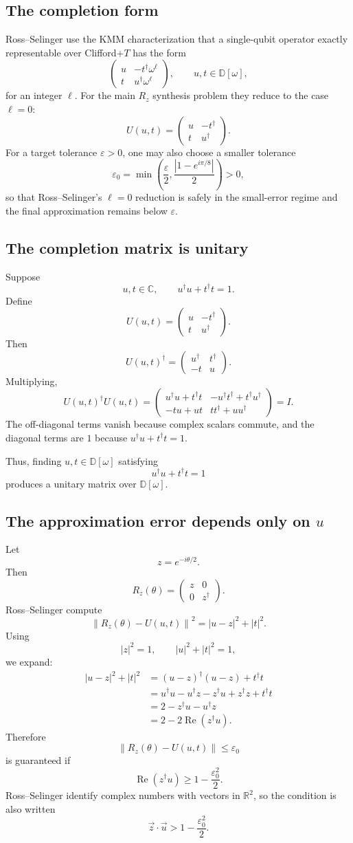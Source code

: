 \documentclass[11pt]{article}
\newcommand{\C}{\mathbb C}
\newcommand{\R}{\mathbb R}
\newcommand{\Dw}{\mathbb D[\omega]}
\newcommand{\eps}{\varepsilon}
\newcommand{\opnorm}[1]{\left\|#1\right\|}
\newcommand{\mat}[1]{\begin{pmatrix}#1\end{pmatrix}}
\begin{document}
\subsection{The completion form}

Ross--Selinger use the KMM characterization that a single-qubit operator exactly representable over Clifford+$T$ has the form
\[
  \mat{u & -t^\dagger\omega^\ell\\ t & u^\dagger\omega^\ell},
  \qquad u,t\in\Dw,
\]
for an integer $\ell$. For the main $R_z$ synthesis problem they reduce to the case $\ell=0$:
\[
  U(u,t)=\mat{u & -t^\dagger\\ t & u^\dagger}.
\]
For a target tolerance $\eps>0$, one may also choose a smaller tolerance
\[
  \eps_0=\min\left(\frac{\eps}{2},\frac{|1-e^{i\pi/8}|}{2}\right)>0,
\]
so that Ross--Selinger's $\ell=0$ reduction is safely in the small-error regime and the final approximation remains below $\eps$.

\subsection{The completion matrix is unitary}

Suppose
\[
  u,t\in\C,
  \qquad
  u^\dagger u+t^\dagger t=1.
\]
Define
\[
  U(u,t)=\mat{u & -t^\dagger\\ t & u^\dagger}.
\]
Then
\[
  U(u,t)^\dagger=\mat{u^\dagger&t^\dagger\\-t&u}.
\]
Multiplying,
\[
  U(u,t)^\dagger U(u,t)
  =
  \mat{u^\dagger u+t^\dagger t & -u^\dagger t^\dagger+t^\dagger u^\dagger\\
       -tu+ut & tt^\dagger+uu^\dagger}
  =I.
\]
The off-diagonal terms vanish because complex scalars commute, and the diagonal terms are $1$ because $u^\dagger u+t^\dagger t=1$.

Thus, finding $u,t\in\Dw$ satisfying
\[
  u^\dagger u+t^\dagger t=1
\]
produces a unitary matrix over $\Dw$.

\subsection{The approximation error depends only on $u$}

Let
\[
  z=e^{-i\theta/2}.
\]
Then
\[
  R_z(\theta)=\mat{z&0\\0&z^\dagger}.
\]
Ross--Selinger compute
\[
  \opnorm{R_z(\theta)-U(u,t)}^2
  =|u-z|^2+|t|^2.
\]
Using
\[
  |z|^2=1,
  \qquad
  |u|^2+|t|^2=1,
\]
we expand:
\begin{align*}
  |u-z|^2+|t|^2
  &= (u-z)^\dagger(u-z)+t^\dagger t\\
  &= u^\dagger u-u^\dagger z-z^\dagger u+z^\dagger z+t^\dagger t\\
  &=2-z^\dagger u-u^\dagger z\\
  &=2-2\operatorname{Re}(z^\dagger u).
\end{align*}
Therefore
\[
  \opnorm{R_z(\theta)-U(u,t)}\le \eps_0
\]
is guaranteed if
\[
  \operatorname{Re}(z^\dagger u)\ge 1-\frac{\eps_0^2}{2}.
\]
Ross--Selinger identify complex numbers with vectors in $\R^2$, so the condition is also written
\[
  \vec z\cdot \vec u>1-\frac{\eps_0^2}{2}.
\]
\end{document}

